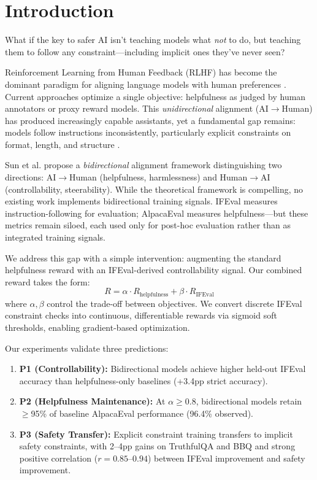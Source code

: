 \section{Introduction}
\label{sec:introduction}

What if the key to safer AI isn't teaching models what \emph{not} to do, but teaching them to follow any constraint---including implicit ones they've never seen?

Reinforcement Learning from Human Feedback (RLHF) has become the dominant paradigm for aligning language models with human preferences \citep{ouyang2022instructgpt}. Current approaches optimize a single objective: helpfulness as judged by human annotators or proxy reward models. This \emph{unidirectional} alignment (AI$\to$Human) has produced increasingly capable assistants, yet a fundamental gap remains: models follow instructions inconsistently, particularly explicit constraints on format, length, and structure \citep{zhou2023ifeval}.

Sun et al. \citep{sun2024bidirectional} propose a \emph{bidirectional} alignment framework distinguishing two directions: AI$\to$Human (helpfulness, harmlessness) and Human$\to$AI (controllability, steerability). While the theoretical framework is compelling, no existing work implements bidirectional training signals. IFEval \citep{zhou2023ifeval} measures instruction-following for evaluation; AlpacaEval \citep{dubois2024alpacaeval} measures helpfulness---but these metrics remain siloed, each used only for post-hoc evaluation rather than as integrated training signals.

We address this gap with a simple intervention: augmenting the standard helpfulness reward with an IFEval-derived controllability signal. Our combined reward takes the form:
\begin{equation}
R = \alpha \cdot R_{\text{helpfulness}} + \beta \cdot R_{\text{IFEval}}
\end{equation}
where $\alpha, \beta$ control the trade-off between objectives. We convert discrete IFEval constraint checks into continuous, differentiable rewards via sigmoid soft thresholds, enabling gradient-based optimization.

Our experiments validate three predictions:

\begin{enumerate}
    \item \textbf{P1 (Controllability):} Bidirectional models achieve higher held-out IFEval accuracy than helpfulness-only baselines (+3.4pp strict accuracy).
    \item \textbf{P2 (Helpfulness Maintenance):} At $\alpha \geq 0.8$, bidirectional models retain $\geq$95\% of baseline AlpacaEval performance (96.4\% observed).
    \item \textbf{P3 (Safety Transfer):} Explicit constraint training transfers to implicit safety constraints, with 2--4pp gains on TruthfulQA and BBQ and strong positive correlation ($r=0.85$--$0.94$) between IFEval improvement and safety improvement.
\end{enumerate}

